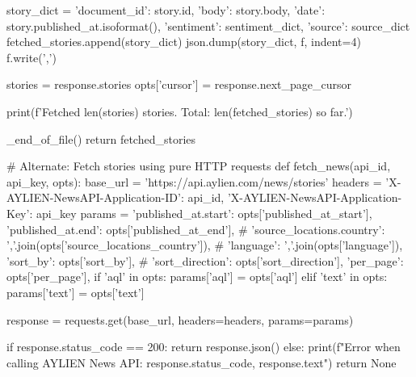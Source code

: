 \begin{pyin}
                    story_dict = {'document_id': story.id, 'body': story.body, 'date': story.published_at.isoformat(),
                                  'sentiment': sentiment_dict, 'source': source_dict}
                    fetched_stories.append(story_dict)
                    json.dump(story_dict, f, indent=4)
                    f.write(',\n')

        stories = response.stories
        opts['cursor'] = response.next_page_cursor

        print(f'Fetched {len(stories)} stories. Total: {len(fetched_stories)} so far.')

    _end_of_file()
    return fetched_stories

# Alternate: Fetch stories using pure HTTP requests
def fetch_news(api_id, api_key, opts):
    base_url = 'https://api.aylien.com/news/stories'
    headers = {
        'X-AYLIEN-NewsAPI-Application-ID': api_id,
        'X-AYLIEN-NewsAPI-Application-Key': api_key
    }
    params = {
        'published_at.start': opts['published_at_start'],
        'published_at.end': opts['published_at_end'],
        # 'source_locations.country': ','.join(opts['source_locations_country']),
        # 'language': ','.join(opts['language']),
        'sort_by': opts['sort_by'],
        # 'sort_direction': opts['sort_direction'],
        'per_page': opts['per_page'],
    }
    if 'aql' in opts:
        params['aql'] = opts['aql']
    elif 'text' in opts:
        params['text'] = opts['text']

    response = requests.get(base_url, headers=headers, params=params)

    if response.status_code == 200:
        return response.json()
    else:
        print(f"Error when calling AYLIEN News API: {response.status_code}, {response.text}")
        return None
\end{pyin}

